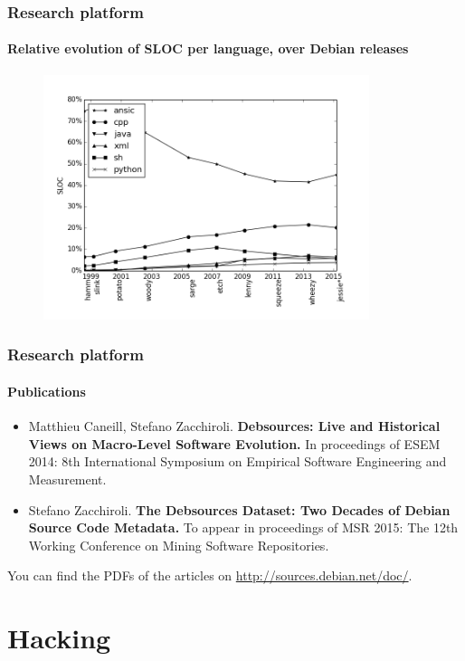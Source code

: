 \documentclass{beamer}
\begin{document}
\begin{frame}
  \frametitle{Research platform}
  \framesubtitle{Relative evolution of SLOC per language, over Debian releases}
  \vspace{-0.3cm}
  \begin{figure}
    \centering
    \includegraphics[width=0.85\textwidth]{img/sloc-evol-rel}
  \end{figure}
\end{frame}

\begin{frame}
  \frametitle{Research platform}
  \framesubtitle{Publications}
  \begin{itemize}
    \item Matthieu Caneill, Stefano Zacchiroli. \textbf{Debsources:
      Live and Historical Views on Macro-Level Software Evolution.} In
      proceedings of ESEM 2014: 8th International Symposium on
      Empirical Software Engineering and Measurement.
    \item Stefano Zacchiroli. \textbf{The Debsources Dataset: Two
      Decades of Debian Source Code Metadata.} To appear in
      proceedings of MSR 2015: The 12th Working Conference on Mining
      Software Repositories.
  \end{itemize}
  \vspace{1cm}
  \small{You can find the PDFs of the articles on \url{http://sources.debian.net/doc/}.}
\end{frame}

\section{Hacking}
\end{document}
